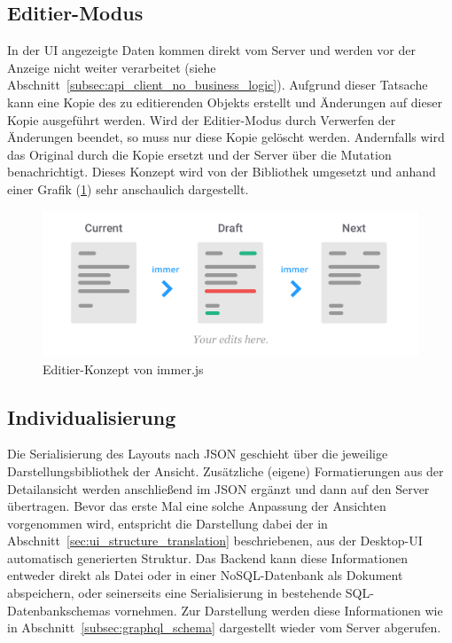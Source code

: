 \subsection{Editier-Modus}
In der UI angezeigte Daten kommen direkt vom Server und werden vor der Anzeige nicht weiter verarbeitet (siehe Abschnitt~\ref{subsec:api_client_no_business_logic}). Aufgrund dieser Tatsache kann eine Kopie des zu editierenden Objekts erstellt und Änderungen auf dieser Kopie ausgeführt werden. Wird der Editier-Modus durch Verwerfen der Änderungen beendet, so muss nur diese Kopie gelöscht werden. Andernfalls wird das Original durch die Kopie ersetzt und der Server über die Mutation benachrichtigt. Dieses Konzept wird von der Bibliothek  \parencite{weststrate_2019} umgesetzt und anhand einer Grafik (\ref{fig:immer_draft_concept}) sehr anschaulich dargestellt.

\begin{figure}
    \centering
    \captionsetup{justification=centering}
    \includegraphics[width=\textwidth]{figures/immer_draft_concept.png}
        \caption{Editier-Konzept von immer.js \parencite{weststrate_2019}}\label{fig:immer_draft_concept}
\end{figure}

\subsection{Individualisierung}
Die Serialisierung des Layouts nach JSON geschieht über die jeweilige Darstellungsbibliothek der Ansicht. Zusätzliche (eigene) Formatierungen aus der Detailansicht werden anschließend im JSON ergänzt und dann auf den Server übertragen. Bevor das erste Mal eine solche Anpassung der Ansichten vorgenommen wird, entspricht die Darstellung dabei der in Abschnitt~\ref{sec:ui_structure_translation} beschriebenen, aus der Desktop-UI automatisch generierten Struktur. Das Backend kann diese Informationen entweder direkt als Datei oder in einer NoSQL-Datenbank als Dokument abspeichern, oder seinerseits eine Serialisierung in bestehende SQL-Datenbankschemas vornehmen. Zur Darstellung werden diese Informationen wie in Abschnitt~\ref{subsec:graphql_schema} dargestellt wieder vom Server abgerufen.

